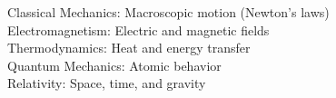 \documentclass[preview]{standalone}
\begin{document}
Classical Mechanics: Macroscopic motion (Newton's laws)\\Electromagnetism: Electric and magnetic fields\\Thermodynamics: Heat and energy transfer\\Quantum Mechanics: Atomic behavior\\Relativity: Space, time, and gravity\\
\end{document}
